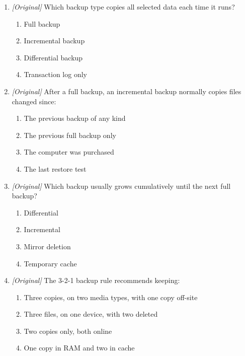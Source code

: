 \begin{enumerate}[label=\textbf{Q\arabic*.}, leftmargin=*]
\begin{enumerate}[label=\Alph*.]
    \item A differential backup copies changes since the last full backup.
    \item An incremental backup copies changes since the last backup of any kind.
    \item Backup and file synchronisation mean exactly the same thing.
  \end{enumerate}
\item \textit{[Original]} Which backup type copies all selected data each time it runs?
  \begin{enumerate}[label=\Alph*.]
\item Full backup
   \item Incremental backup
   \item Differential backup
   \item Transaction log only
  \end{enumerate}

\item \textit{[Original]} After a full backup, an incremental backup normally copies files changed since:
  \begin{enumerate}[label=\Alph*.]
\item The previous backup of any kind
   \item The previous full backup only
   \item The computer was purchased
   \item The last restore test
  \end{enumerate}

\item \textit{[Original]} Which backup usually grows cumulatively until the next full backup?
  \begin{enumerate}[label=\Alph*.]
\item Differential
   \item Incremental
   \item Mirror deletion
   \item Temporary cache
  \end{enumerate}

\item \textit{[Original]} The 3-2-1 backup rule recommends keeping:
  \begin{enumerate}[label=\Alph*.]
\item Three copies, on two media types, with one copy off-site
   \item Three files, on one device, with two deleted
   \item Two copies only, both online
   \item One copy in RAM and two in cache
  \end{enumerate}


\end{enumerate}
